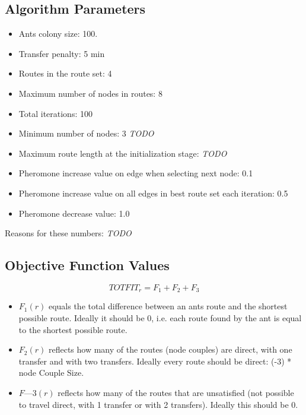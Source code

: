 \subsection{Algorithm Parameters}

\begin{itemize}
\item Ants colony size: 100.
\item Transfer penalty: 5 min
\item Routes in the route set: 4
\item Maximum number of nodes in routes: 8
\item Total iterations: 100
\item Minimum number of nodes: 3 \emph{\color{red} TODO}
\item Maximum route length at the initialization stage: \emph{\color{red} TODO}
\item Pheromone increase value on edge when selecting next node: 0.1
\item Pheromone increase value on all edges in best route set each iteration: 0.5
\item Pheromone decrease value: 1.0
\end{itemize}
Reasons for these numbers: \emph{\color{red} TODO}

\subsection{Objective Function Values}
$$TOTFIT_{r} = F_{1} + F_{2} + F_{3}$$
\begin{itemize}
\item $F_{1}(r)$ equals the total difference between an ants route and the shortest possible route. Ideally it should be 0, i.e. each route found by the ant is equal to the shortest possible route.
\item $F_{2}(r)$ reflects how many of the routes (node couples) are direct, with one transfer and with two transfers. Ideally every route should be direct: (-3) * node Couple Size. 
\item $F—{3}(r)$ reflects how many of the routes that are unsatisfied (not possible to travel direct, with 1 transfer or with 2 transfers). Ideally this should be 0.
\end{itemize}

